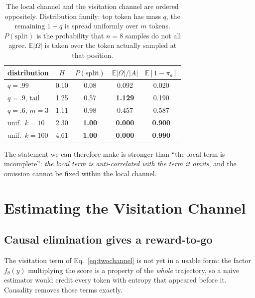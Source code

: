 \documentclass[11pt]{article}
\newcommand{\Om}{\Omega}
\newcommand{\E}{\mathbb{E}}
\begin{document}
\begin{table}[t]
\centering
\footnotesize
\setlength{\tabcolsep}{3.5pt}
\begin{tabular}{lcccc}
\toprule
distribution & $H$ & $P(\mathrm{split})$ & $\E|\Om|/|A|$ & $\E[1{-}\pi_a]$ \\
\midrule
$q{=}.99$          & 0.10 & 0.08 & 0.092 & 0.020 \\
$q{=}.9$, tail     & 1.25 & 0.57 & \textbf{1.129} & 0.190 \\
$q{=}.6$, $m{=}3$  & 1.11 & 0.98 & 0.457 & 0.587 \\
unif.\ $k{=}10$    & 2.30 & \textbf{1.00} & \textbf{0.000} & \textbf{0.900} \\
unif.\ $k{=}100$   & 4.61 & \textbf{1.00} & \textbf{0.000} & \textbf{0.990} \\
\bottomrule
\end{tabular}
\caption{The local channel and the visitation channel are ordered oppositely.
Distribution family: top token has mass $q$, the remaining $1-q$ is spread uniformly
over $m$ tokens. $P(\text{split})$ is the probability that $n{=}8$ samples do not all
agree. $\E|\Om|$ is taken over the token actually sampled at that position.}
\label{tab:anticorr}
\end{table}

The statement we can therefore make is stronger than ``the local term is
incomplete'': \emph{the local term is anti-correlated with the term it omits}, and
the omission cannot be fixed within the local channel.

\section{Estimating the Visitation Channel}
\label{sec:ahdef}

\subsection{Causal elimination gives a reward-to-go}

The visitation term of Eq.~\eqref{eq:twochannel} is not yet in a usable form: the
factor $f_\theta(y)$ multiplying the score is a property of the \emph{whole}
trajectory, so a naive estimator would credit every token with entropy that appeared
before it. Causality removes those terms exactly.
\end{document}
